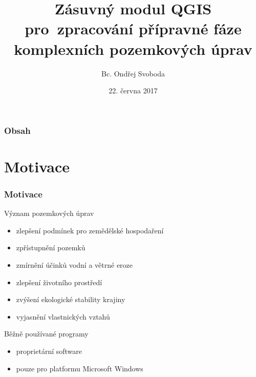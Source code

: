 \documentclass{beamer}
\title[]{Zásuvný modul QGIS pro~zpracování přípravné fáze komplexních pozemkových úprav} %
\author{Bc. Ondřej Svoboda} %
\institute[ČVUT] %
{
České vysoké učení technické v Praze \\ %
Fakulta stavební \\
Obor Geomatika
}
\date{22. června 2017} %
\begin{document}
\begin{frame}
\titlepage %
\end{frame}

\begin{frame}
\frametitle{Obsah} %
\tableofcontents %
\end{frame}


\section{Motivace} %

\begin{frame}

\frametitle{Motivace}

Význam pozemkových úprav
\begin{itemize}
	\item zlepšení podmínek pro zemědělské hospodaření
	\item zpřístupnění pozemků
	\item zmírnění účinků vodní a větrné eroze
	\item zlepšení životního prostředí
	\item zvýšení ekologické stability krajiny
	\item vyjasnění vlastnických vztahů
\end{itemize}

\bigskip

Běžně používané programy
\begin{itemize}
	\item proprietární software
	\item pouze pro platformu Microsoft Windows
\end{itemize}

\end{frame}
\end{document}
